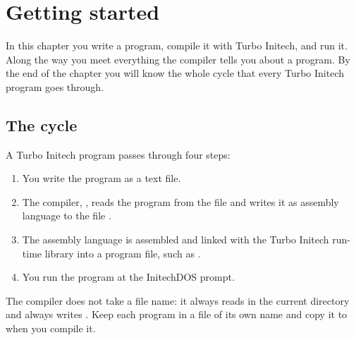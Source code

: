 \chapter{Getting started}

In this chapter you write a program, compile it with Turbo Initech, and
run it.  Along the way you meet everything the compiler tells you about a
program.  By the end of the chapter you will know the whole cycle that
every Turbo Initech program goes through.

\section{The cycle}
A Turbo Initech program passes through four steps:

\begin{enumerate}
\item You write the program as a text file.
\item The compiler, , reads the program from the file
   and writes it as assembly language to the file
  .
\item The assembly language is assembled and linked with the Turbo
  Initech run-time library into a program file, such as .
\item You run the program at the InitechDOS prompt.
\end{enumerate}

The compiler does not take a file
name: it always reads  in the current directory and always
writes .  Keep each program in a file of its own name and
copy it to  when you compile it.

